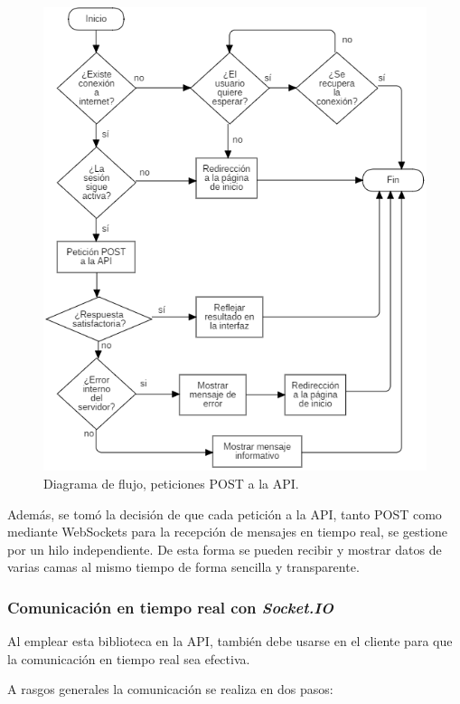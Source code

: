 \begin{figure}
	\centering
	\includegraphics[width=1\textwidth]{../img/flowchart.png}
	\caption{Diagrama de flujo, peticiones POST a la API.}
	\label{fig:flowchart}
\end{figure}

Además, se tomó la decisión de que cada petición a la API, tanto POST como mediante WebSockets para la recepción de mensajes en tiempo real, se gestione por un hilo independiente. De esta forma se pueden recibir y mostrar datos de varias camas al mismo tiempo de forma sencilla y transparente. 

\subsubsection{Comunicación en tiempo real con \textit{Socket.IO}}

Al emplear esta biblioteca en la API, también debe usarse en el cliente para que la comunicación en tiempo real sea efectiva. 

A rasgos generales la comunicación se realiza en dos pasos: 

